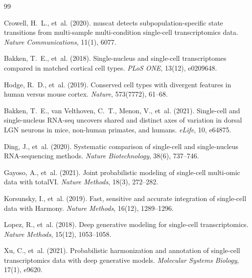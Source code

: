 \documentclass[11pt]{article}
\begin{document}

\begin{thebibliography}{99}

Crowell, H.~L., et~al. (2020).
\newblock muscat detects subpopulation-specific state transitions from multi-sample multi-condition single-cell transcriptomics data.
\newblock \textit{Nature Communications}, 11(1), 6077.

Bakken, T.~E., et~al. (2018).
\newblock Single-nucleus and single-cell transcriptomes compared in matched cortical cell types.
\newblock \textit{PLoS ONE}, 13(12), e0209648.

Hodge, R.~D., et~al. (2019).
\newblock Conserved cell types with divergent features in human versus mouse cortex.
\newblock \textit{Nature}, 573(7772), 61--68.

Bakken, T.~E., van Velthoven, C.~T., Menon, V., et~al. (2021).
\newblock Single-cell and single-nucleus RNA-seq uncovers shared and distinct axes of variation in dorsal LGN neurons in mice, non-human primates, and humans.
\newblock \textit{eLife}, 10, e64875.

Ding, J., et~al. (2020).
\newblock Systematic comparison of single-cell and single-nucleus RNA-sequencing methods.
\newblock \textit{Nature Biotechnology}, 38(6), 737--746.

Gayoso, A., et~al. (2021).
\newblock Joint probabilistic modeling of single-cell multi-omic data with totalVI.
\newblock \textit{Nature Methods}, 18(3), 272--282.

Korsunsky, I., et~al. (2019).
\newblock Fast, sensitive and accurate integration of single-cell data with Harmony.
\newblock \textit{Nature Methods}, 16(12), 1289--1296.

Lopez, R., et~al. (2018).
\newblock Deep generative modeling for single-cell transcriptomics.
\newblock \textit{Nature Methods}, 15(12), 1053--1058.

Xu, C., et~al. (2021).
\newblock Probabilistic harmonization and annotation of single-cell transcriptomics data with deep generative models.
\newblock \textit{Molecular Systems Biology}, 17(1), e9620.

\end{thebibliography}
\end{document}
